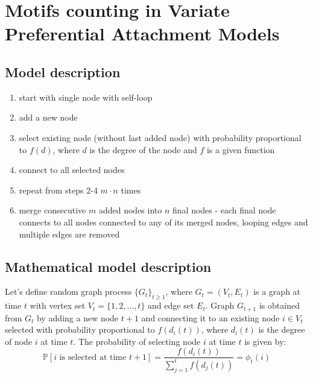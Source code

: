 \documentclass{article}
\begin{document}
\newpage

\section*{Motifs counting in Variate Preferential Attachment Models}

\subsection*{Model description}
\begin{enumerate}
    \item start with single node with self-loop
    \item add a new node
    \item select existing node (without last added node) with probability proportional to $f(d)$, where $d$ is the degree of the node and $f$ is a given function
    \item connect to all selected nodes
    \item repeat from steps 2-4 $m \cdot n$ times
    \item merge consecutive $m$ added nodes into $n$ final nodes - each final node connects to all nodes connected to any of its merged nodes, looping edges and multiple edges are removed
\end{enumerate}

\subsection*{Mathematical model description}
Let's define random graph process $\{G_t\}_{t \geq 1}$, where $G_t = (V_t, E_t)$ is a graph at time $t$ with vertex set $V_t = \{1, 2, \ldots, t\}$ and edge set $E_t$.
Graph $G_{t+1}$ is obtained from $G_t$ by adding a new node $t+1$ and connecting it to an existing node $i \in V_t$ selected with probability proportional to $f(d_i(t))$, where $d_i(t)$ is the degree of node $i$ at time $t$.
\newline
\newline
The probability of selecting node $i$ at time $t$ is given by:
\begin{equation}
    \mathds{P}[i \text{ is selected at time } t+1] = \frac{f(d_i(t))}{\sum_{j=1}^{t} f(d_j(t))} = \phi_t(i)
\end{equation}
\end{document}
